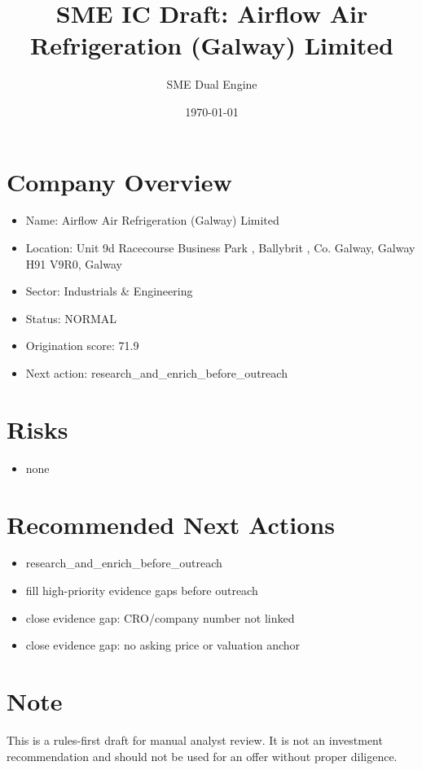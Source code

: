 \documentclass[11pt,a4paper]{article}
\title{SME IC Draft: Airflow Air Refrigeration (Galway) Limited}
\author{SME Dual Engine}
\date{\today}
\begin{document}
\maketitle
\section*{Company Overview}
\begin{itemize}[leftmargin=1.4em]
\item Name: Airflow Air Refrigeration (Galway) Limited
\item Location: Unit 9d Racecourse Business Park , Ballybrit , Co. Galway, Galway H91 V9R0, Galway
\item Sector: Industrials \& Engineering
\item Status: NORMAL
\item Origination score: 71.9
\item Next action: research\_and\_enrich\_before\_outreach
\end{itemize}
\section*{Risks}
\begin{itemize}[leftmargin=1.4em]
\item none
\end{itemize}
\section*{Recommended Next Actions}
\begin{itemize}[leftmargin=1.4em]
\item research\_and\_enrich\_before\_outreach
\item fill high-priority evidence gaps before outreach
\item close evidence gap: CRO/company number not linked
\item close evidence gap: no asking price or valuation anchor
\end{itemize}
\section*{Note}
This is a rules-first draft for manual analyst review. It is not an investment
recommendation and should not be used for an offer without proper diligence.
\end{document}
